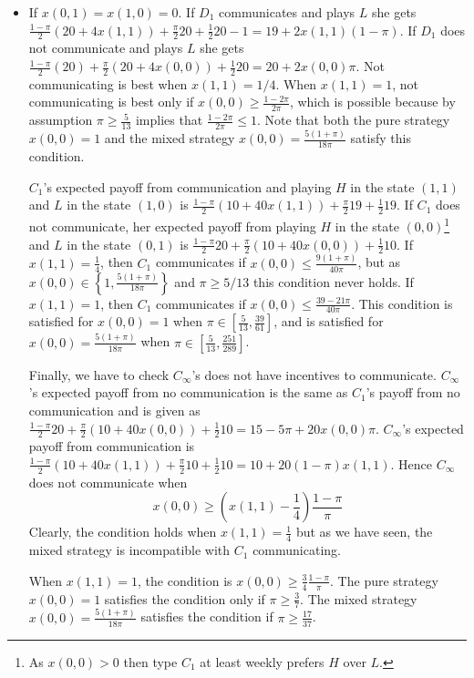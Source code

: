 \documentclass[12pt]{article}
\theoremstyle{definition}
\theoremstyle{remark}
\begin{document}
\begin{itemize}
    \item If $x(0,1)=x(1,0)=0$. If $D_1$ communicates and plays $L$ she gets $\frac{1-\pi}{2}(20 + 4x(1,1))+\frac{\pi}{2}20+\frac{1}{2}20-1= 19 + 2x(1,1)(1-\pi)$. If $D_1$ does not communicate and plays $L$ she gets $\frac{1-\pi}{2}(20)+\frac{\pi}{2}(20 + 4x(0,0))+\frac{1}{2}20= 20 + 2x(0,0)\pi$. Not communicating is best when $x(1,1)=1/4$. When $x(1,1)=1$, not communicating is best only if $x(0,0)\geq \frac{1-2\pi}{2\pi}$, which is possible because by assumption $\pi\geq \frac{5}{13}$ implies that  $\frac{1-2\pi}{2\pi}\leq 1$. Note that both the pure strategy $x(0,0)=1$ and the mixed strategy $x(0,0)=\frac{5(1+\pi)}{18\pi}$ satisfy this condition.
    
   $C_1$'s expected payoff from communication and playing $H$ in the state $(1,1)$ and $L$ in the state $(1,0)$ is $\frac{1-\pi}{2}(10+40x(1,1))+\frac{\pi}{2}19+\frac{1}{2}19$. If $C_1$ does not communicate, her expected payoff from playing $H$ in the state $(0,0)$\footnote{As $x(0,0)>0$ then type $C_1$ at least weekly prefers $H$ over $L$.} and $L$ in the state $(0,1)$ is $\frac{1-\pi}{2}20+\frac{\pi}{2}(10+40x(0,0))+\frac{1}{2}10$. If $x(1,1)=\frac{1}{4}$, then $C_1$ communicates if $x(0,0)\leq \frac{9(1+\pi)}{40\pi}$, but as $x(0,0)\in\left\{ 1, \frac{5(1+\pi)}{18\pi} \right\}$ and $\pi\geq 5/13$ this condition never holds. If $x(1,1)=1$, then $C_1$ communicates if $x(0,0)\leq \frac{39-21\pi}{40\pi}$. This condition is satisfied for $x(0,0)=1$ when $\pi\in\left[ \frac{5}{13},\frac{39}{61} \right]$, and is satisfied for $x(0,0)=\frac{5(1+\pi)}{18\pi}$ when $\pi\in \left[ \frac{5}{13}, \frac{251}{289} \right]$. 
    
    Finally, we have to check $C_\infty$'s does not have incentives to communicate. $C_\infty$'s expected payoff from no communication is the same as $C_1$'s payoff from no communication and is given as $\frac{1-\pi}{2}20+\frac{\pi}{2}(10+40x(0,0))+\frac{1}{2}10=15-5\pi+20x(0,0)\pi$. $C_\infty$'s expected payoff from communication is $\frac{1-\pi}{2}(10+40x(1,1))+\frac{\pi}{2}10+\frac{1}{2}10=10+20(1-\pi)x(1,1)$. Hence $C_\infty$ does not communicate when
    $$x(0,0)\geq \left(x(1,1)-\frac{1}{4}\right)\frac{1-\pi}{\pi}$$
   Clearly, the condition holds when $x(1,1)=\frac{1}{4}$ but as we have seen, the mixed strategy is incompatible with $C_1$ communicating.
    
    When $x(1,1)=1$, the condition is $x(0,0)\geq \frac{3}{4}\frac{1-\pi}{\pi}$. The pure strategy $x(0,0)=1$ satisfies the condition only if  $\pi\geq \frac{3}{7}$. The mixed strategy $x(0,0)=\frac{5(1+\pi)}{18\pi}$ satisfies the condition if $\pi\geq \frac{17}{37}$.
    

\end{itemize}
\end{document}
